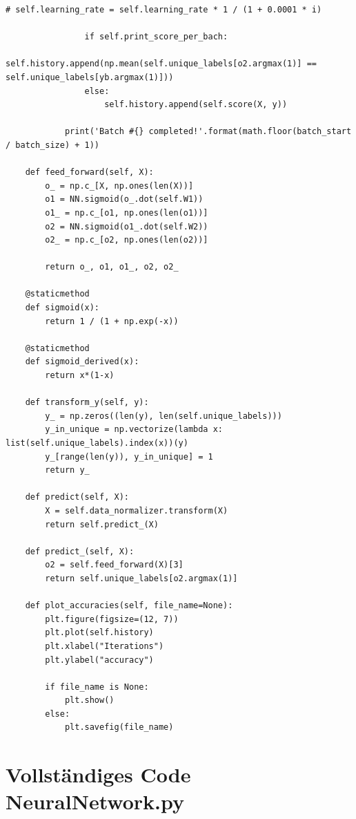 \begin{lstlisting}[style=py]
                # self.learning_rate = self.learning_rate * 1 / (1 + 0.0001 * i)

                if self.print_score_per_bach:
                    self.history.append(np.mean(self.unique_labels[o2.argmax(1)] == self.unique_labels[yb.argmax(1)]))
                else:
                    self.history.append(self.score(X, y))

            print('Batch #{} completed!'.format(math.floor(batch_start / batch_size) + 1))

    def feed_forward(self, X):
        o_ = np.c_[X, np.ones(len(X))]
        o1 = NN.sigmoid(o_.dot(self.W1))
        o1_ = np.c_[o1, np.ones(len(o1))]
        o2 = NN.sigmoid(o1_.dot(self.W2))
        o2_ = np.c_[o2, np.ones(len(o2))]

        return o_, o1, o1_, o2, o2_

    @staticmethod
    def sigmoid(x):
        return 1 / (1 + np.exp(-x))

    @staticmethod
    def sigmoid_derived(x):
        return x*(1-x)

    def transform_y(self, y):
        y_ = np.zeros((len(y), len(self.unique_labels)))
        y_in_unique = np.vectorize(lambda x: list(self.unique_labels).index(x))(y)
        y_[range(len(y)), y_in_unique] = 1
        return y_

    def predict(self, X):
        X = self.data_normalizer.transform(X)
        return self.predict_(X)

    def predict_(self, X):
        o2 = self.feed_forward(X)[3]
        return self.unique_labels[o2.argmax(1)]

    def plot_accuracies(self, file_name=None):
        plt.figure(figsize=(12, 7))
        plt.plot(self.history)
        plt.xlabel("Iterations")
        plt.ylabel("accuracy")

        if file_name is None:
            plt.show()
        else:
            plt.savefig(file_name)

\end{lstlisting}

\section*{Vollständiges Code NeuralNetwork.py}

